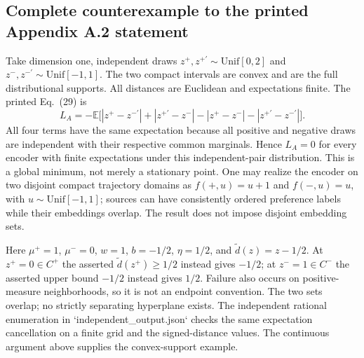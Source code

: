 \documentclass[10pt]{article}
\begin{document}
\subsection*{Complete counterexample to the printed Appendix A.2 statement}
Take dimension one, independent draws \(z^+,z^{+\prime}\sim\mathrm{Unif}[0,2]\) and \(z^-,z^{-\prime}\sim\mathrm{Unif}[-1,1]\). The two compact intervals are convex and are the full distributional supports. All distances are Euclidean and expectations finite. The printed Eq. (29) is \[L_A=-\mathbb E\bigl[|z^+-z^{-\prime}|+|z^{+\prime}-z^-|-|z^+-z^-|-|z^{+\prime}-z^{-\prime}|\bigr].\] All four terms have the same expectation because all positive and negative draws are independent with their respective common marginals. Hence \(L_A=0\) for every encoder with finite expectations under this independent-pair distribution. This is a global minimum, not merely a stationary point. One may realize the encoder on two disjoint compact trajectory domains as \(f(+,u)=u+1\) and \(f(-,u)=u\), with \(u\sim\mathrm{Unif}[-1,1]\); sources can have consistently ordered preference labels while their embeddings overlap. The result does not impose disjoint embedding sets.\par
Here \(\mu^+=1\), \(\mu^-=0\), \(w=1\), \(b=-1/2\), \(\eta=1/2\), and \(\widetilde d(z)=z-1/2\). At \(z^+=0\in C^+\) the asserted \(\widetilde d(z^+)\ge1/2\) instead gives \(-1/2\); at \(z^-=1\in C^-\) the asserted upper bound \(-1/2\) instead gives \(1/2\). Failure also occurs on positive-measure neighborhoods, so it is not an endpoint convention. The two sets overlap; no strictly separating hyperplane exists. The independent rational enumeration in `independent\_output.json` checks the same expectation cancellation on a finite grid and the signed-distance values. The continuous argument above supplies the convex-support example.\par
\end{document}
